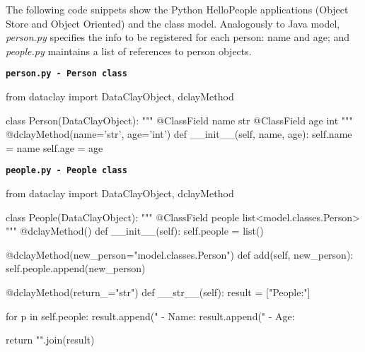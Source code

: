 The following code snippets show the Python HelloPeople applications (Object Store and Object Oriented) and the class model. Analogously to Java model, \textit{person.py} specifies the info to be registered for each person: name and age; and \textit{people.py} maintains a list of references to person objects.

\begin{tBox}
\texttt{\bfseries\textcolor{basecolor}{person.py - Person class}}
\begin{python}
from dataclay import DataClayObject, dclayMethod

class Person(DataClayObject):
    """
    @ClassField name str
    @ClassField age int
    """
    @dclayMethod(name='str', age='int')
    def __init__(self, name, age):
        self.name = name
        self.age = age
\end{python}
\end{tBox}

\begin{tBox}
\texttt{\bfseries\textcolor{basecolor}{people.py - People class}}
\begin{python}
from dataclay import DataClayObject, dclayMethod

class People(DataClayObject):
    """
    @ClassField people list<model.classes.Person>
    """
    @dclayMethod()
    def __init__(self):
        self.people = list()

    @dclayMethod(new_person="model.classes.Person")
    def add(self, new_person):
        self.people.append(new_person)

    @dclayMethod(return_="str")
    def __str__(self):
        result = ["People:"]

        for p in self.people:
            result.append(" - Name: %
            result.append(" - Age: %

        return "\n".join(result)
\end{python}
\end{tBox}

